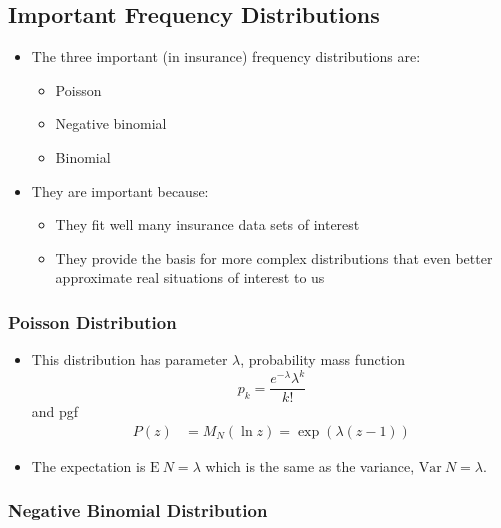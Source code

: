 \documentclass[]{book}
\begin{document}
\subsection{Important Frequency
Distributions}\label{important-frequency-distributions}

\begin{itemize}
\item
  The three important (in insurance) frequency distributions are:

  \begin{itemize}
  \item
    Poisson
  \item
    Negative binomial
  \item
    Binomial
  \end{itemize}
\item
  They are important because:

  \begin{itemize}
  \item
    They fit well many insurance data sets of interest
  \item
    They provide the basis for more complex distributions that even
    better approximate real situations of interest to us
  \end{itemize}
\end{itemize}

\subsubsection{Poisson Distribution}\label{poisson-distribution}

\begin{itemize}
\item
  This distribution has parameter \(\lambda\), probability mass function
  \[p_k = \frac{e^{-\lambda}\lambda^k}{k!}\] and pgf \[\begin{aligned}
  P(z) &= M_N (\ln z) = \exp(\lambda(z-1))\end{aligned}\]
\item
  The expectation is \(\mathrm{E~}N = \lambda\) which is the same as the
  variance, \(\mathrm{Var~}N = \lambda\).
\end{itemize}

\subsubsection{Negative Binomial
Distribution}\label{negative-binomial-distribution}
\end{document}
